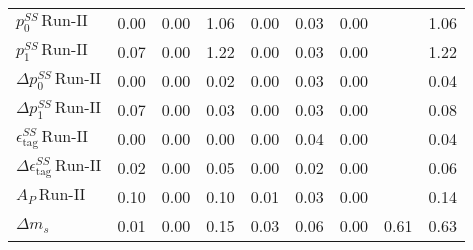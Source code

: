 \begin{tabular}{l  c  c  c  c  c  c  c  | c }
$p_{0}^{SS} \, \text{Run-II}$ & 0.00 & 0.00 & 1.06 & 0.00 & 0.03 & 0.00 &  & 1.06 \\ 
$p_{1}^{SS} \, \text{Run-II}$ & 0.07 & 0.00 & 1.22 & 0.00 & 0.03 & 0.00 &  & 1.22 \\ 
$\Delta p_{0}^{SS} \, \text{Run-II}$ & 0.00 & 0.00 & 0.02 & 0.00 & 0.03 & 0.00 &  & 0.04 \\ 
$\Delta p_{1}^{SS} \, \text{Run-II}$ & 0.07 & 0.00 & 0.03 & 0.00 & 0.03 & 0.00 &  & 0.08 \\ 
$\epsilon_{\text{tag}}^{SS} \, \text{Run-II}$ & 0.00 & 0.00 & 0.00 & 0.00 & 0.04 & 0.00 &  & 0.04 \\ 
$\Delta \epsilon_{\text{tag}}^{SS} \, \text{Run-II}$ & 0.02 & 0.00 & 0.05 & 0.00 & 0.02 & 0.00 &  & 0.06 \\ 
$A_{P} \, \text{Run-II}$ & 0.10 & 0.00 & 0.10 & 0.01 & 0.03 & 0.00 &  & 0.14 \\ 
$\Delta m_{s}$ & 0.01 & 0.00 & 0.15 & 0.03 & 0.06 & 0.00 & 0.61 & 0.63 \\ 
\hline
\hline
\end{tabular}
